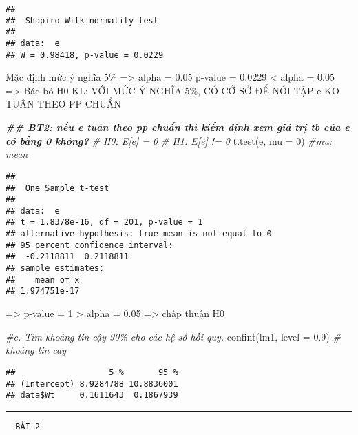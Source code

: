 \documentclass[
]{article}
\newenvironment{Shaded}{\begin{snugshade}}{\end{snugshade}}
\newcommand{\AttributeTok}[1]{\textcolor[rgb]{0.77,0.63,0.00}{#1}}
\newcommand{\CommentTok}[1]{\textcolor[rgb]{0.56,0.35,0.01}{\textit{#1}}}
\newcommand{\DecValTok}[1]{\textcolor[rgb]{0.00,0.00,0.81}{#1}}
\newcommand{\DocumentationTok}[1]{\textcolor[rgb]{0.56,0.35,0.01}{\textbf{\textit{#1}}}}
\newcommand{\FloatTok}[1]{\textcolor[rgb]{0.00,0.00,0.81}{#1}}
\newcommand{\FunctionTok}[1]{\textcolor[rgb]{0.00,0.00,0.00}{#1}}
\newcommand{\NormalTok}[1]{#1}
\begin{document}
\begin{verbatim}
## 
##  Shapiro-Wilk normality test
## 
## data:  e
## W = 0.98418, p-value = 0.0229
\end{verbatim}

Mặc định mức ý nghĩa 5\% =\textgreater{} alpha = 0.05 p-value = 0.0229
\textless{} alpha = 0.05 =\textgreater{} Bác bỏ H0 KL: VỚI MỨC Ý NGHĨA
5\%, CÓ CỞ SỞ ĐỂ NÓI TẬP e KO TUÂN THEO PP CHUẨN

\begin{Shaded}
\begin{Highlighting}[]
\DocumentationTok{\#\# BT2: nếu e tuân theo pp chuẩn thì kiểm định xem giá trị tb của e có bằng 0 không?}
\CommentTok{\#     H0: E[e] = 0}
\CommentTok{\#     H1: E[e] != 0}
\FunctionTok{t.test}\NormalTok{(e, }\AttributeTok{mu =} \DecValTok{0}\NormalTok{) }\CommentTok{\#mu: mean}
\end{Highlighting}
\end{Shaded}

\begin{verbatim}
## 
##  One Sample t-test
## 
## data:  e
## t = 1.8378e-16, df = 201, p-value = 1
## alternative hypothesis: true mean is not equal to 0
## 95 percent confidence interval:
##  -0.2118811  0.2118811
## sample estimates:
##    mean of x 
## 1.974751e-17
\end{verbatim}

=\textgreater{} p-value = 1 \textgreater{} alpha = 0.05 =\textgreater{}
chấp thuận H0

\begin{Shaded}
\begin{Highlighting}[]
\CommentTok{\#c. Tìm khoảng tin cậy 90\% cho các hệ số hồi quy.}
\FunctionTok{confint}\NormalTok{(lm1, }\AttributeTok{level =} \FloatTok{0.9}\NormalTok{) }\CommentTok{\# khoảng tin cay}
\end{Highlighting}
\end{Shaded}

\begin{verbatim}
##                   5 %       95 %
## (Intercept) 8.9284788 10.8836001
## data$Wt     0.1611643  0.1867939
\end{verbatim}

\begin{center}\rule{0.5\linewidth}{0.5pt}\end{center}

\begin{verbatim}
  BÀI 2
  
\end{verbatim}
\end{document}
